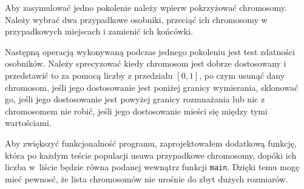 \documentclass[12pt,a4paper]{article}
\begin{document}
Aby zasymulować jedno pokolenie należy wpierw pokrzyżować chromosomy. Należy wybrać dwa przypadkowe osobniki, przeciąć ich chromosomy w przypadkowych miejscach i zamienić ich końcówki.

Następną operacją wykonywaną podczas jednego pokoleniu jest test zdatności osobników. Należy sprecyzować kiedy chromosom jest dobrze dostosowany i przedstawić to za pomocą liczby z przedziału $[0,1]$, po czym usunąć dany chromosom, jeśli jego dostosowanie jest poniżej granicy wymierania, sklonować go, jeśli jego dostosowanie jest powyżej granicy rozmnażania lub nic z chromosomem nie robić, jeśli jego dostosowanie mieści się między tymi wartościami.

Aby zwiększyć funkcjonalność programu, zaprojektowałem dodatkową funkcję, która po każdym teście populacji usuwa przypadkowe chromosomy, dopóki ich liczba w~liście będzie równa podanej wewnątrz funkcji \lstinline|main|. Dzięki temu mogę mieć pewnosć, że lista chromosomów nie urośnie do zbyt dużych rozmiarów.
\end{document}
